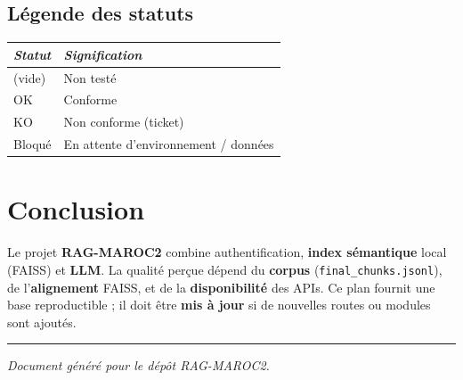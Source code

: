 \documentclass[11pt,a4paper]{article}
\begin{document}
\subsection{Légende des statuts}
\begin{center}
\small
\begin{tabular}{@{}l@{\quad}l@{}}
\toprule
\textit{Statut} & \textit{Signification} \\
\midrule
(vide) & Non testé \\
OK & Conforme \\
KO & Non conforme (ticket) \\
Bloqué & En attente d'environnement / données \\
\bottomrule
\end{tabular}
\end{center}

\section{Conclusion}
Le projet \textbf{RAG-MAROC2} combine authentification, \textbf{index sémantique} local (FAISS) et \textbf{LLM}. La qualité perçue dépend du \textbf{corpus} (\texttt{final\_chunks.jsonl}), de l'\textbf{alignement} FAISS, et de la \textbf{disponibilité} des APIs. Ce plan fournit une base reproductible ; il doit être \textbf{mis à jour} si de nouvelles routes ou modules sont ajoutés.

\vspace{1em}
\hrule
\small\centering\textit{Document généré pour le dépôt RAG-MAROC2.}
\end{document}
